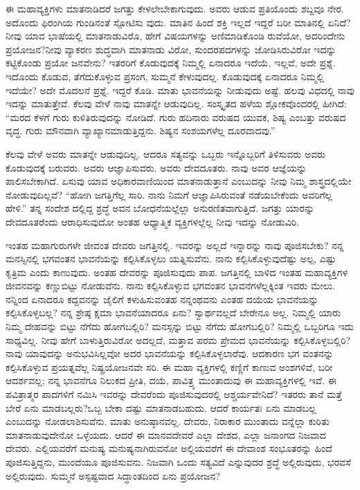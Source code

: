 ಈ ಮಹಾವ್ಯಕ್ತಿಗಳು ಮಾತನಾಡಿದರೆ ಜಗತ್ತು ಕೇಳಲೇಬೇಕಾಗುವುದು. ಅವರು ಆಡುವ ಪ್ರತಿಯೊಂದು ಶಬ್ದವೂ ನೇರ. ಅದೊಂದು ಫಿರಂಗಿಯ ಗುಂಡಿನಂತೆ ಸ್ಪೋಟಿಸು ವುದು. ಮಾತಿನ ಹಿಂದೆ ಶಕ್ತಿ ಇಲ್ಲದೆ ಇದ್ದರೆ ಬರೀ ಮಾತಿನಲ್ಲಿ ಏನಿದೆ? ನೀವು ಯಾವ ಭಾಷೆಯಲ್ಲಿ ಮಾತನಾಡುವಿರೊ, ಹೇಗೆ ವಿಷಯಗಳನ್ನು ಅಣಿಮಾಡಿಕೊಂಡಿ ರುವೆಯೋ, ಅದರಿಂದೇನು ಪ್ರಯೋಜನ?ನೀವು ವ್ಯಾಕರಣ ಶುದ್ಧವಾಗಿ ಮಾತನಾಡು ವಿರೋ, ಸುಂದರಪದಗಳನ್ನು ಜೋಡಿಸಿರುವಿರೋ ಇದನ್ನು ಕಟ್ಟಿಕೊಂಡು ಪ್ರಯೋ ಜನವೇನು? ಇತರರಿಗೆ ಕೊಡುವುದಕ್ಕೆ ನಿಮ್ಮಲ್ಲಿ ಏನಾದರೂ ಇದೆಯೆ, ಇಲ್ಲವೆ, ಅದೇ ಪ್ರಶ್ನೆ. ಇದೊಂದು ಕೊಡುವ, ತೆಗೆದುಕೊಳ್ಳುವ ಪ್ರಸಂಗ, ಸುಮ್ಮನೆ ಕೇಳುವುದಲ್ಲ. ಕೊಡುವುದಕ್ಕೆ ಏನಾದರೂ ನಿಮ್ಮಲ್ಲಿ ಇದೆಯೇ? ಅದೇ ಮೊದಲನೆ ಪ್ರಶ್ನೆ. ಇದ್ದರೆ ಕೊಡಿ. ಮಾತು ಭಾವನೆಯನ್ನು ನೀಡುವುದು ಅಷ್ಟೆ. ಹಲವು ವಿಧದಲ್ಲಿ ನಾವು ಇದನ್ನು ಮಾತುತ್ತೇವೆ. ಕೆಲವು ವೇಳೆ ನಾವು ಮಾತನ್ನೇ ಆಡುವುದಿಲ್ಲ. ಸಂಸ್ಕೃತದ ಹಳೆಯ ಶ್ಲೋಕವೊಂದರಲ್ಲಿ ಹೀಗಿದೆ: “ಮರದ ಕೆಳಗೆ ಗುರು ಕುಳಿತಿರುವುದನ್ನು ನೋಡಿದೆ. ಗುರು ಹದಿನಾರು ವರುಷದ ಯುವಕ, ಶಿಷ್ಯ ಎಂಬತ್ತು ವರುಷದ ವೃದ್ಧ. ಗುರು ಮೌನವಾಗಿ ವ್ಯಾಖ್ಯಾನಮಾಡುತ್ತಿದ್ದನು. ಶಿಷ್ಯನ ಸಂಶಯಗಳೆಲ್ಲ ದೂರವಾದವು.”

ಕೆಲವು ವೇಳೆ ಅವರು ಮಾತನ್ನೇ ಆಡುವುದಿಲ್ಲ. ಆದರೂ ಸತ್ಯವನ್ನು ಒಬ್ಬರು ಇನ್ನೊಬ್ಬರಿಗೆ ತಿಳಿಸುವರು ಅವರು ಕೊಡುವುದಕ್ಕೆ ಬರುವರು. ಅವರು ಆಜ್ಞಾಪಿಸುವರು. ಅವರು ದೇವದೂತರು. ನಾವು ಅವರ ಆಜ್ಞೆಯನ್ನು ಪಾಲಿಸಬೇಕಾಗಿದೆ. ಏಸುವು ಯಾವ ಅಧಿಕಾರವಾಣಿಯಿಂದ ಮಾತನಾಡುತ್ತಾನೆ ಎಂಬುದನ್ನು ನೀವು ನಿಮ್ಮ ಶಾಸ್ತ್ರದಲ್ಲಿಯೇ ನೋಡುವುದಿಲ್ಲವೆ? “ಹೋಗಿ ಜಗತ್ತಿಗೆಲ್ಲ ಸಾರಿ. ನಾನು ನಿಮಗೆ ಆಜ್ಞಾಪಿಸಿರುವಂತೆ ನಡೆಯಬೇಕೆಂದು ಅವರಿಗೆಲ್ಲ ಹೇಳಿ.” ತನ್ನ ಸಂದೇಶ ದಲ್ಲಿದ್ದ ಶ್ರದ್ಧೆ ಅವನ ಬೋಧನೆಯಲ್ಲೆಲ್ಲಾ ಅನುರಣಿತವಾಗುತ್ತಿದೆ. ಜಗತ್ತು ಯಾರನ್ನು ದೇವದೂತರೆಂದು ಆರಾಧಿಸುವುದೋ ಅಂತಹ ಆಧ್ಯಾತ್ಮಿಕ ವ್ಯಕ್ತಿಗಳಲ್ಲೆಲ್ಲ ನೀವು ಇದನ್ನು ನೋಡುವಿರಿ.

ಇಂತಹ ಮಹಾಗುರುಗಳೇ ಜೀವಂತ ದೇವರು ಜಗತ್ತಿನಲ್ಲಿ. ಇವರನ್ನು ಅಲ್ಲದೆ ಇನ್ನಾರನ್ನು ನಾವು ಪೂಜಿಸಬೇಕು? ನನ್ನ ಮನಸ್ಸಿನಲ್ಲಿ ಭಗವಂತನ ಭಾವನೆಯನ್ನು ಕಲ್ಪಿಸಿಕೊಳ್ಳಲು ಯತ್ನಿಸುವೆನು. ನಾನು ಕಲ್ಪಿಸಿಕೊಳ್ಳುವುದೆಷ್ಟು ಅಲ್ಪ, ಎಷ್ಟು ಕೃತ್ರಿಮ ಎಂದು ಕಾಣುವುದು. ಅಂತಹ ದೇವರನ್ನು ಪೂಜಿಸುವುದು ಪಾಪ. ಜಗತ್ತಿನಲ್ಲಿ ಬಾಳಿದ ಇಂತಹ ಮಹಾವ್ಯಕ್ತಿಗಳ ಜೀವನವನ್ನು ಕಣ್ಣುಬಿಟ್ಟು ನೋಡುವೆನು. ನಾನು ಕಲ್ಪಿಸಿಕೊಳ್ಳುವ ಭಗವಂತನ ಭಾವನೆಗಳೆಲ್ಲಕ್ಕಿಂತ ಇವರು ಮೇಲು. ನನ್ನಿಂದ ಏನಾದರೂ ಕದ್ದವನನ್ನು ಜೈಲಿಗೆ ಕಳುಹಿಸುವಂತಹ ನನ್ನಂಥವನು ಎಂತಹ ದಯೆಯ ಭಾವನೆಯನ್ನು ಕಲ್ಪಿಸಿಕೊಳ್ಳಬಲ್ಲ? ನನ್ನ ಶ್ರೇಷ್ಠ ಕ್ಷಮಾ ಭಾವನೆಯಾದರೂ ಏನು? ಸ್ವಾರ್ಥವಲ್ಲದೆ ಬೇರೇನೂ ಅಲ್ಲ. ನಿಮ್ಮಲ್ಲಿ ಯಾರು ನಿಮ್ಮ ದೇಹವನ್ನು ಬಿಟ್ಟು ನೆಗೆದು ಹೋಗಬಲ್ಲಿರಿ? ಮನಸ್ಸನ್ನು ಬಿಟ್ಟು ನೆಗೆದು ಹೋಗಬಲ್ಲಿರಿ? ನಿಮ್ಮಲ್ಲಿ ಒಬ್ಬರಿಗೂ ಇದು ಸಾಧ್ಯವಿಲ್ಲ. ನೀವು ಹೇಗೆ ಬಾಳುತ್ತಿರುವಿರೋ ಅದಲ್ಲದೆ, ಮತ್ತಾವ ಪರಮ ಪ್ರೇಮದ ಭಾವನೆಯನ್ನು ಕಲ್ಪಿಸಿಕೊಳ್ಳಬಲ್ಲಿರಿ? ನಾವು ಯಾವುದನ್ನು ಅನುಭವಿಸಿಲ್ಲವೋ ಅದರ ಭಾವನೆಯನ್ನು ಕಲ್ಪಿಸಿಕೊಳ್ಳಲಾರೆವು. ಆದಕಾರಣ ಭಗ ವಂತನನ್ನು ಕಲ್ಪಿಸಿಕೊಳ್ಳುವ ಪ್ರಯತ್ನವೆಲ್ಲ ನಿಷ್ಪ್ರಯೋಜನವೇ ಸರಿ. ಈ ಮಹಾ ವ್ಯಕ್ತಿಗಳಲ್ಲಿ ಕಣ್ಣಿಗೆ ಕಾಣುವ ಅಂಶಗಳಿವೆ, ಬರೀ ಆದರ್ಶವಲ್ಲ; ನನ್ನ ಭಾವನೆಗೂ ನಿಲುಕದ ಪ್ರೀತಿ, ದಯೆ, ಪಾವಿತ್ರ್ಯ ಮುಂತಾದುವು ಈ ಮಹಾವ್ಯಕ್ತಿಗಳಲ್ಲಿ ಇವೆ. ಈ ಪವಿತ್ರಾತ್ಮರ ಪಾದಗಳಿಗೆ ನಮಿಸಿ ಇವರನ್ನು ದೇವರೆಂದು ಪೂಜಿಸುವುದರಲ್ಲಿ ಆಶ್ಚರ್ಯವೇನಿದೆ? ಇತರರು ತಾನೆ ಮತ್ತೆ ಬೇರೆ ಏನು ಮಾಡಬಲ್ಲರು?ಒಬ್ಬ ಬೇಕಾ ದಷ್ಟು ಮಾತನಾಡಬಹುದು. ಆದರೆ ಕಾರ್ಯತಃ ಏನು ಮಾಡಬಲ್ಲ ಎಂಬುದನ್ನು ನೋಡಲಾಶಿಸುವೆನು. ಮಾತು ಅನುಷ್ಠಾನವಲ್ಲ. ದೇವರು, ನಿರಾಕಾರ ಮುಂತಾದು ವನ್ನೆಲ್ಲಾ ಕುರಿತು ಮಾತನಾಡುವುದೇನೋ ಒಳ್ಳೆಯದು. ಆದರೆ ಈ ಮಾನವದೇವರೆ ಎಲ್ಲಾ ದೇಶದ, ಎಲ್ಲಾ ಜನಾಂಗದ ನಿಜವಾದ ದೇವರು. ಎಲ್ಲಿಯವರೆಗೆ ಮನುಷ್ಯ ಮನುಷ್ಯನಾಗಿರುವನೋ ಅಲ್ಲಿಯವರೆಗೆ ಈ ದೇವಾಂಶ ಸಂಭೂತರನ್ನು ಹಿಂದೆ ಪೂಜಿಸುತ್ತಿದ್ದನು, ಮುಂದೆಯೂ ಪೂಜಿಸುವನು. ನಿಜವಾಗಿ ಒಂದು ಸತ್ಯವಿದೆ ಎನ್ನುವುದರ ಶ್ರದ್ಧೆ ಅಲ್ಲಿರುವುದು, ಭರವಸೆ ಅಲ್ಲಿರುವುದು. ಸುಮ್ಮನೆ ಅಸ್ಪಷ್ಟವಾದ ಸಿದ್ಧಾಂತದಿಂದ ಏನು ಪ್ರಯೋಜನ?

